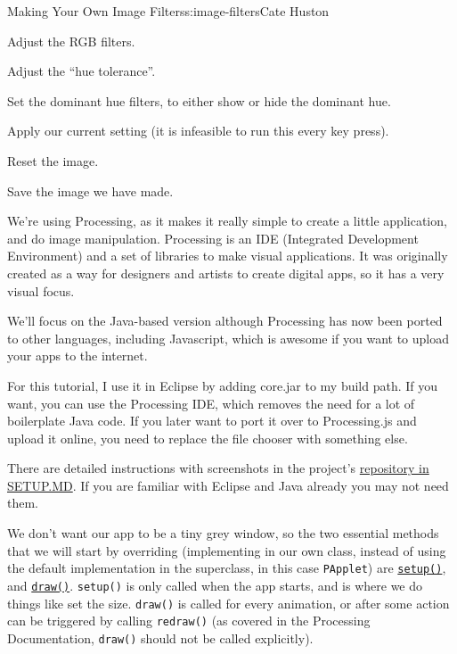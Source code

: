 \begin{aosachapter}{Making Your Own Image Filters}{s:image-filters}{Cate Huston}
\begin{aosaitemize}

\item
  Adjust the RGB filters.
\item
  Adjust the ``hue tolerance''.
\item
  Set the dominant hue filters, to either show or hide the dominant hue.
\item
  Apply our current setting (it is infeasible to run this every key
  press).
\item
  Reset the image.
\item
  Save the image we have made.
\end{aosaitemize}

We're using Processing, as it makes it really simple to create a little
application, and do image manipulation. Processing is an IDE (Integrated
Development Environment) and a set of libraries to make visual
applications. It was originally created as a way for designers and
artists to create digital apps, so it has a very visual focus.

We'll focus on the Java-based version although Processing has now been
ported to other languages, including Javascript, which is awesome if you
want to upload your apps to the internet.

For this tutorial, I use it in Eclipse by adding core.jar to my build
path. If you want, you can use the Processing IDE, which removes the
need for a lot of boilerplate Java code. If you later want to port it
over to Processing.js and upload it online, you need to replace the file
chooser with something else.

There are detailed instructions with screenshots in the project's
\href{https://github.com/aosabook/500lines/blob/master/image-filters/SETUP.MD}{repository
in SETUP.MD}. If you are familiar with Eclipse and Java already you may
not need them.

\label{processing-basics}

\label{size-and-color}

We don't want our app to be a tiny grey window, so the two essential
methods that we will start by overriding (implementing in our own class,
instead of using the default implementation in the superclass, in this
case \texttt{PApplet}) are
\href{http://processing.org/reference/setup_.html}{\texttt{setup()}},
and \href{http://processing.org/reference/draw_.html}{\texttt{draw()}}.
\texttt{setup()} is only called when the app starts, and is where we do
things like set the size. \texttt{draw()} is called for every animation,
or after some action can be triggered by calling \texttt{redraw()} (as
covered in the Processing Documentation, \texttt{draw()} should not be
called explicitly).


\end{aosachapter}
